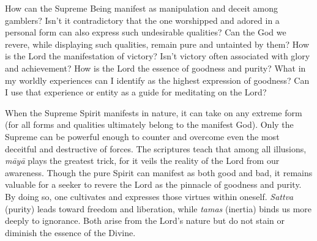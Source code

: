 \newpage
\begin{mananam}{}
\normalfont\mananamtext How can the Supreme Being manifest as manipulation and deceit among gamblers? Isn’t it contradictory that the one worshipped and adored in a personal form can also express such undesirable qualities?
Can the God we revere, while displaying such qualities, remain pure and untainted by them?
How is the Lord the manifestation of victory? Isn’t victory often associated with glory and achievement?
How is the Lord the essence of goodness and purity?
What in my worldly experiences can I identify as the highest expression of goodness? Can I use that experience or entity as a guide for meditating on the Lord?
\end{mananam}
\sreflect
\begin{inspiration}{}
\normalfont\mananamtext When the Supreme Spirit manifests in nature, it can take on any extreme form (for all forms and qualities ultimately belong to the manifest God). Only the Supreme can be powerful enough to counter and overcome even the most deceitful and destructive of forces. The scriptures teach that among all illusions, \emph{māyā} plays the greatest trick, for it veils the reality of the Lord from our awareness.
Though the pure Spirit can manifest as both good and bad, it remains valuable for a seeker to revere the Lord as the pinnacle of goodness and purity. By doing so, one cultivates and expresses those virtues within oneself. \emph{Sattva} (purity) leads toward freedom and liberation, while \emph{tamas} (inertia) binds us more deeply to ignorance. Both arise from the Lord’s nature but do not stain or diminish the essence of the Divine.
\end{inspiration}
\newpage


